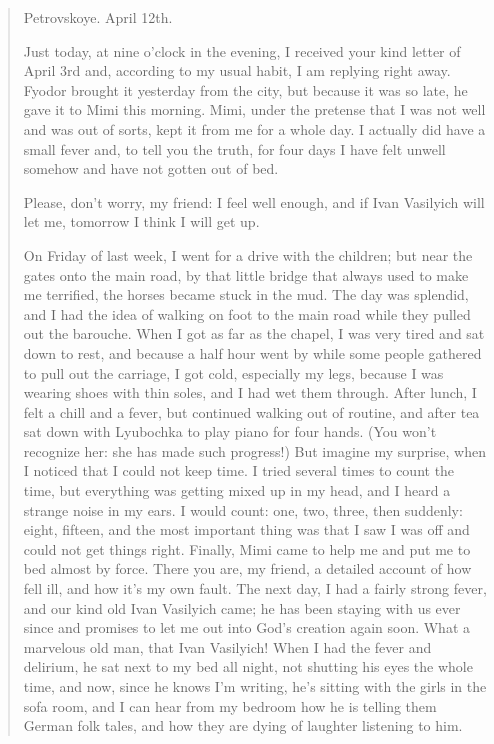 \begin{quotation}
\begin{flushright}
Petrovskoye. April 12th.
\end{flushright}

Just today, at nine o'clock in the evening, I received your kind letter of April 3rd and, according to my usual habit, I am replying right away. Fyodor brought it yesterday from the city, but because it was so late, he gave it to Mimi this morning. Mimi, under the pretense that I was not well and was out of sorts, kept it from me for a whole day. I actually did have a small fever and, to tell you the truth, for four days I have felt unwell somehow and have not gotten out of bed.

Please, don't worry, my friend: I feel well enough, and if Ivan Vasilyich will let me, tomorrow I think I will get up.

On Friday of last week, I went for a drive with the children; but near the gates onto the main road, by that little bridge that always used to make me terrified, the horses became stuck in the mud. The day was splendid, and I had the idea of walking on foot to the main road while they pulled out the barouche. When I got as far as the chapel, I was very tired and sat down to rest, and because a half hour went by while some people gathered to pull out the carriage, I got cold, especially my legs, because I was wearing shoes with thin soles, and I had wet them through. After lunch, I felt a chill and a fever, but continued walking out of routine, and after tea sat down with Lyubochka to play piano for four hands. (You won't recognize her: she has made such progress!) But imagine my surprise, when I noticed that I could not keep time. I tried several times to count the time, but everything was getting mixed up in my head, and I heard a strange noise in my ears. I would count: one, two, three, then suddenly: eight, fifteen, and the most important thing was that I saw I was off and could not get things right. Finally, Mimi came to help me and put me to bed almost by force. There you are, my friend, a detailed account of how fell ill, and how it's my own fault. The next day, I had a fairly strong fever, and our kind old Ivan Vasilyich came; he has been staying with us ever since and promises to let me out into God's creation again soon. What a marvelous old man, that Ivan Vasilyich! When I had the fever and delirium, he sat next to my bed all night, not shutting his eyes the whole time, and now, since he knows I'm writing, he's sitting with the girls in the sofa room, and I can hear from my bedroom how he is telling them German folk tales, and how they are dying of laughter listening to him.


\end{quotation}
